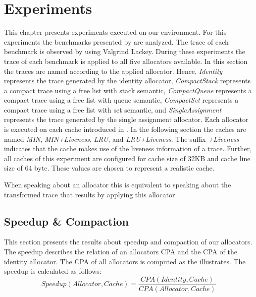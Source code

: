 \documentclass[onecolumn, openright, master, english, signatures]{dbrgrptt}
\begin{document}
\chapter{Experiments}\label{cha:experiment}

This chapter presents experiments executed on our environment.
For this experiments the benchmarks presented by  are analyzed.
The \ac{trace} of each benchmark is observed by using Valgrind Lackey.
During these experiments the \ac{trace} of each benchmark is applied to all five allocators available.
In this section the \ac{trace}s are named according to the applied allocator.
Hence, \emph{Identity} represents the \ac{trace} generated by the identity allocator, \emph{CompactStack} represents a compact \ac{trace} using a free list with stack semantic, \emph{CompactQueue} represents a compact \ac{trace} using a free list with queue semantic, \emph{CompactSet} represents a compact \ac{trace} using a free list with set semantic, and \emph{SingleAssignment} represents the \ac{trace} generated by the single assignment allocator.
Each allocator is executed on each cache introduced in .
In the following section the caches are named \emph{\ac{MIN}}, \emph{\ac{MIN}+Liveness}, \emph{\ac{LRU}}, and \emph{\ac{LRU}+Liveness}.
The suffix \emph{+Liveness} indicates that the cache makes use of the liveness information of a \ac{trace}.
Further, all caches of this experiment are configured for cache size of 32KB and cache line size of 64 byte.
These values are chosen to represent a realistic cache.

\begin{remark}
When speaking about an allocator this is equivalent to speaking about the transformed \ac{trace} that results by applying this allocator.
\end{remark}

\section{Speedup \& Compaction}
\label{sec:exp-speedup-compaction}

This section presents the results about speedup and compaction of our allocators.
The speedup describes the relation of an allocators \ac{CPA} and the \ac{CPA} of the identity allocator.
The \ac{CPA} of all allocators is computed as the  illustrates.
The speedup is calculated as follows:
$$Speedup(Allocator, Cache) = \frac{CPA(Identity, Cache)}{CPA(Allocator, Cache)}$$
\end{document}
